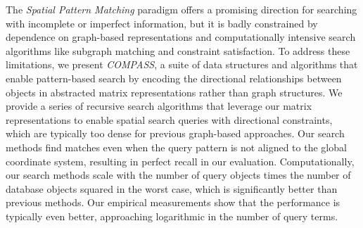

The \textit{Spatial Pattern Matching} paradigm offers a promising direction for searching with incomplete or imperfect information, but it is badly constrained by dependence on graph-based representations and computationally intensive search algorithms like subgraph matching and constraint satisfaction. 
To address these limitations, we present \emph{COMPASS}, a suite of data structures and algorithms that enable pattern-based search by encoding the directional relationships between objects in abstracted matrix representations rather than graph structures.
We provide a series of recursive search algorithms that leverage our matrix representations to enable spatial search queries with directional constraints, which are typically too dense for previous graph-based approaches.
Our search methods find matches even when the query pattern is not aligned to the global coordinate system, resulting in perfect recall in our evaluation. 
Computationally, our search methods scale with the number of query objects times the number of database objects squared in the worst case, which is significantly better than previous methods.
Our empirical measurements show that the performance is typically even better, approaching logarithmic in the number of query terms.









%